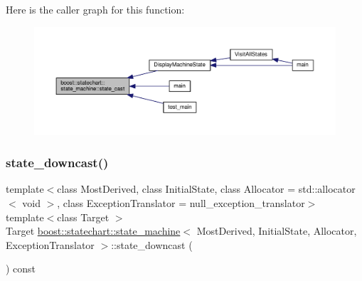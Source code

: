 Here is the caller graph for this function\+:
\nopagebreak
\begin{figure}[H]
\begin{center}
\leavevmode
\includegraphics[width=350pt]{classboost_1_1statechart_1_1state__machine_aabd07005b47036311b5e80e05c1746c2_icgraph}
\end{center}
\end{figure}
\mbox{\label{classboost_1_1statechart_1_1state__machine_a8054170cced8b908272d9d8ba9e5deb9}} 
\subsubsection{\texorpdfstring{state\+\_\+downcast()}{state\_downcast()}}
{\footnotesize\ttfamily template$<$class Most\+Derived, class Initial\+State, class Allocator = std\+::allocator$<$ void $>$, class Exception\+Translator = null\+\_\+exception\+\_\+translator$>$ \\
template$<$class Target $>$ \\
Target \mbox{\hyperlink{classboost_1_1statechart_1_1state__machine}{boost\+::statechart\+::state\+\_\+machine}}$<$ Most\+Derived, Initial\+State, Allocator, Exception\+Translator $>$\+::state\+\_\+downcast (\begin{DoxyParamCaption}{ }\end{DoxyParamCaption}) const\hspace{0.3cm}{\ttfamily [inline]}}

